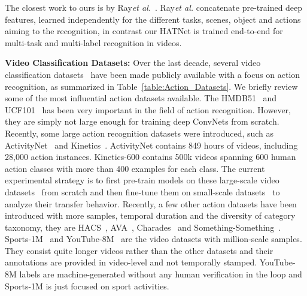 \documentclass[runningheads]{llncs}
\begin{document}
The closest work to ours is by Ray\textit{et al.}~\cite{soadata}. Ray\textit{et al.} concatenate pre-trained deep features, learned independently for the different tasks, scenes, object and actions aiming to the recognition, in contrast our HATNet is trained end-to-end for multi-task and multi-label recognition in videos.





\noindent
\textbf{Video Classification Datasets:}  
Over the last decade, several video classification datasets~\cite{mpii,actnet,hmdb51,kth,ucf101} have been made publicly available with a focus on action recognition, as summarized in Table~\ref{table:Action_Datasets}. We briefly review some of the most influential action datasets available.  The HMDB51~\cite{hmdb51} and UCF101~\cite{ucf101} has been very important in the field of action recognition. However, they are simply not large enough for training deep ConvNets from scratch. Recently, some large action recognition datasets were introduced, such as ActivityNet~\cite{actnet} and Kinetics~\cite{kinetics}. ActivityNet contains 849 hours of videos, including 28,000 action instances.  Kinetics-600 contains 500k videos spanning 600 human action classes with more than 400 examples for each class. The current experimental strategy is to first pre-train models on these large-scale video datasets~\cite{actnet,sport1m,kinetics} from scratch and then fine-tune them on small-scale datasets~\cite{hmdb51,ucf101} to analyze their transfer behavior. Recently, a few other action datasets have been introduced  with more samples, temporal duration  and the diversity of category taxonomy, they are HACS~\cite{hacs}, AVA~\cite{ava}, Charades~\cite{Charades} and Something-Something~\cite{smt-smt}. Sports-1M~\cite{sport1m} and YouTube-8M~\cite{youtube8m} are the video datasets with million-scale samples. They consist quite longer videos rather than the other datasets and their annotations are provided in video-level and not temporally stamped. YouTube-8M labels are machine-generated without any human verification in the loop and Sports-1M is just focused on sport activities.




\begin{table*}[t] 
\centering
\small
\tabcolsep=0.2cm
\caption{Statistics of the HVU training set for different categories. The category with the highest number of labels and annotations is the object category.}
\label{tab:HVU_Cats}
\vspace{-0.6cm}
\end{table*}
\end{document}
